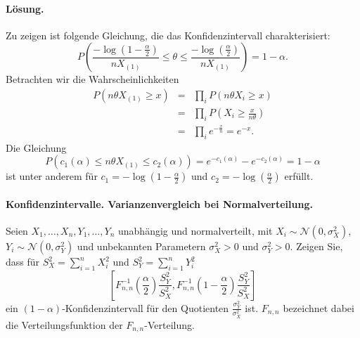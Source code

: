 \paragraph*{Lösung.} Zu zeigen ist folgende Gleichung, die das 
Konfidenzintervall charakterisiert:
\begin{equation}
    P\left(   \frac{- \log \left( 1 - \frac{\alpha}{2} \right)}{n X_{(1)}} \leq \theta \leq 
    \frac{- \log \left( \frac{\alpha}{2} \right)}{n X_{(1)}} \right) = 1-\alpha.
\end{equation}
Betrachten wir die Wahrscheinlichkeiten
\begin{eqnarray}
    P \left( n\theta X_{(1)}\geq x \right) &=&  \prod_i P \left( n\theta X_i \geq x \right) \\
    &=& \prod_i P\left( X_i \geq \frac{x}{n\theta} \right) \\
    &=& \prod_i e^{-\frac{x}{n}} = e^{-x}.
\end{eqnarray}
Die Gleichung
\begin{equation}
    P \left( c_1(\alpha) \leq n\theta X_{(1)} \leq c_2(\alpha) \right) = 
    e^{-c_1(\alpha)} - e^{-c_2(\alpha)} = 1-\alpha
\end{equation}
ist unter anderem für $c_1 = -\log \left( 1-\frac{\alpha}{2} \right)$ und
$c_2 = -\log \left( \frac{\alpha}{2} \right)$ erfüllt.





\paragraph{Konfidenzintervalle. Varianzenvergleich bei Normalverteilung. } 
Seien $X_1,\ldots,X_n,Y_1,\ldots,Y_n$ unabhängig und normalverteilt, mit 
$X_i \sim \mathcal N(0, \sigma^2_X)$, $Y_i \sim \mathcal N(0, \sigma^2_Y)$
und unbekannten Parametern $\sigma^2_X>0$ und $\sigma^2_Y>0$. 
Zeigen Sie, dass für $S^2_X = \sum_{i=1}^{n} X_i^2$ und $S^2_Y = \sum_{i=1}^{n} Y_i^2$
\begin{equation}
    \left[ F^{-1}_{n,n} \left( \frac{\alpha}{2} \right) \frac{S_Y^2}{S_X^2},
    F^{-1}_{n,n} \left( 1 - \frac{\alpha}{2}  \right) \frac{S_Y^2}{S_X^2}     \right]
\end{equation}
ein $(1-\alpha)$-Konfidenzintervall für den Quotienten $\frac{\sigma^2_Y}{\sigma^2_X}$ ist.
$F_{n,n}$ bezeichnet dabei die Verteilungsfunktion der $F_{n,n}$-Verteilung.

